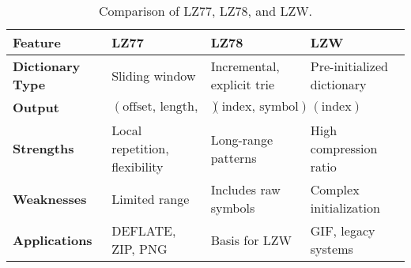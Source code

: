 \begin{table}[h!]
\caption{Comparison of LZ77, LZ78, and LZW.}
\centering
\begin{tabular}{|p{2.4cm}|p{4cm}|p{3.6cm}|p{4cm}|}
\hline
\textbf{Feature}            & \textbf{LZ77}                  & \textbf{LZ78}                  & \textbf{LZW}                  \\ \hline
\textbf{Dictionary Type}    & Sliding window                & Incremental, explicit trie     & Pre-initialized dictionary    \\ \hline
\textbf{Output}             & \((\text{offset, length, symbol})\) & \((\text{index, symbol})\)     & \((\text{index})\)            \\ \hline
\textbf{Strengths}          & Local repetition, flexibility & Long-range patterns            & High compression ratio        \\ \hline
\textbf{Weaknesses}         & Limited range                & Includes raw symbols           & Complex initialization        \\ \hline
\textbf{Applications}       & DEFLATE, ZIP, PNG            & Basis for LZW                  & GIF, legacy systems           \\ \hline
\end{tabular}
\label{tab:lz_comparison}
\end{table}
